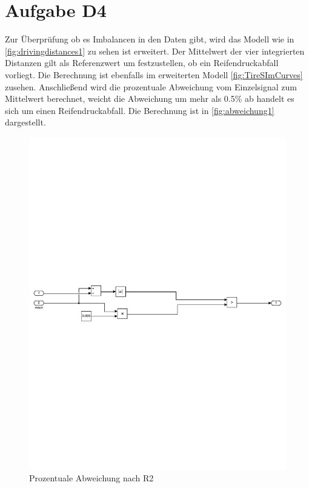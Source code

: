 \chapter{Aufgabe D4}

Zur Überprüfung ob es Imbalancen in den Daten gibt, wird das Modell wie in \autoref{fig:drivingdistances1} zu sehen ist erweitert.
Der Mittelwert der vier integrierten Distanzen gilt als Referenzwert um festzustellen, ob ein Reifendruckabfall vorliegt. Die Berechnung ist ebenfalls im erweiterten Modell \autoref{fig:TireSImCurves} zusehen. Anschließend wird die prozentuale Abweichung vom Einzelsignal zum Mittelwert berechnet, weicht die Abweichung um mehr als 0.5\% ab handelt es sich um einen Reifendruckabfall. Die Berechnung ist in \autoref{fig:abweichung1} dargestellt. 
\vspace{-1em}
\begin{figure}[H]
	\centering
	\includegraphics[width=1\linewidth]{../Graphiken/PDFSplit/3_PDFsam_SebastianTireSim2.pdf}
	\caption{Prozentuale Abweichung nach R2}
	\label{fig:abweichung1}
\end{figure}
